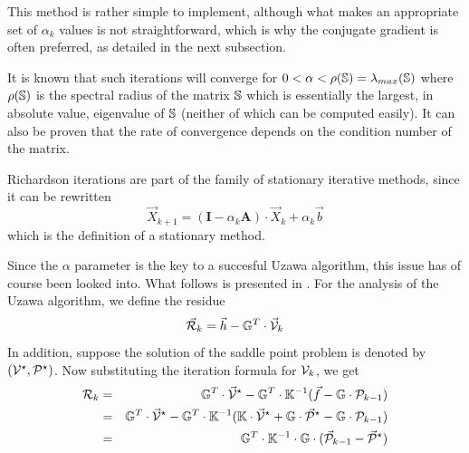 This method is rather simple to implement, although
what makes an appropriate set of $\alpha_k$ values is not straightforward, which is why 
the conjugate gradient is often preferred, as detailed in the next subsection. 

It is known that such iterations will converge for $0< \alpha < \rho({\mathbb{S}})= \lambda_{max}({\mathbb{S}})$ 
where $\rho({\mathbb{S}})$ is the spectral radius of the matrix ${\mathbb{S}}$
which is essentially the largest, in absolute value, eigenvalue of ${\mathbb{S}}$ (neither of which 
can be computed easily).  
It can also be proven that the rate of convergence depends on the condition number of the matrix.

Richardson iterations are part of the family of stationary iterative methods, since it can be rewritten 
\begin{equation}
{\vec X}_{k+1} = ({\bm I} - \alpha_k {\bm A} ) \cdot {\vec X}_k + \alpha_k {\vec b}
\end{equation}
which is the definition of a stationary method. 

Since the $\alpha$ parameter is the key to a succesful Uzawa algorithm, 
this issue has of course been looked into. What follows is 
presented in \cite[p221]{braess}.
For the analysis of the Uzawa algorithm, we define the residue
\[
\vec {\cal R}_k = \vec h - \mathbb{G}^T \cdot \vec{\cal V}_k
\]
In addition, suppose the solution of the saddle point problem is denoted
by $({\cal V}^\star,{\cal P}^\star)$.
Now substituting the iteration formula for ${\cal V}_k$, we get
\begin{eqnarray}
{\cal R}_k 
&=& {\mathbb{G}}^T\cdot\vec{\cal V}^\star -\mathbb{G}^T\cdot \mathbb{K}^{-1} (\vec f - \mathbb{G}\cdot {\cal P}_{k-1}) \\
&=& {\mathbb{G}}^T\cdot\vec{\cal V}^\star -\mathbb{G}^T\cdot \mathbb{K}^{-1} ({\mathbb{K}}\cdot\vec{\cal V}^\star + {\mathbb{G}}\cdot\vec{\cal P}^\star - \mathbb{G}\cdot {\cal P}_{k-1}) \\
&=& \mathbb{G}^T \cdot \mathbb{K}^{-1} \cdot \mathbb{G}\cdot (\vec {\cal P}_{k-1} - \vec{\cal P}^\star) 
\end{eqnarray}

